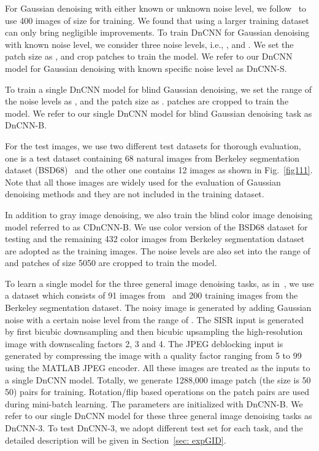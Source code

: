 \documentclass[journal]{IEEEtran}
\begin{document}
For Gaussian denoising with either known or unknown noise level, we follow~\cite{chen2015trainable} to use 400 images of size  for training. We found that using a larger training dataset can only bring negligible improvements. To train DnCNN for Gaussian denoising with known noise level, we consider three noise levels, i.e., ,  and .
We set the patch size as , and crop  patches to train the model. We refer to our DnCNN model for Gaussian denoising with known specific noise level as DnCNN-S.

To train a single DnCNN model for blind Gaussian denoising, we set the range of the noise levels as , and the patch size as .  patches are cropped to train the model. We refer to our single DnCNN model for blind Gaussian denoising task as DnCNN-B.

For the test images, we use two different test datasets for thorough evaluation, one is a test dataset containing 68 natural images from Berkeley segmentation dataset (BSD68)~\cite{roth2009fields} and the other one contains 12 images as shown in Fig.~\ref{fig111}. Note that all those images are widely used for the evaluation of Gaussian denoising methods and they are not included in the training dataset.

In addition to gray image denoising, we also train the blind color image denoising model referred to as CDnCNN-B. We use color version of the BSD68 dataset for testing and
the remaining 432 color images from Berkeley segmentation dataset are adopted as the training images. The noise levels are also set into the range of  and  patches of size 5050 are cropped to train the model.

{To learn a single model for the three general image denoising tasks}, as in~\cite{kim2015accurate}, we use a dataset which consists of 91 images from~\cite{yang2010image} and 200 training images from the Berkeley segmentation dataset. The noisy image is generated by adding Gaussian noise with a certain noise level from the range of . The SISR input is generated by first bicubic downsampling and then bicubic upsampling the high-resolution image with downscaling factors 2, 3 and 4. The JPEG deblocking input is generated by compressing the image with a quality factor ranging from 5 to 99 using the MATLAB JPEG encoder. All these images are treated as the inputs to a single DnCNN model. Totally, we generate 1288,000 image patch (the size is 50  50) pairs for training. Rotation/flip based operations on the patch pairs are used during mini-batch learning. The parameters are initialized with DnCNN-B. We refer to our single DnCNN model for these three general image denoising tasks as DnCNN-3. To test DnCNN-3, we adopt different test set for each task, and the detailed description will be given in Section~\ref{sec: expGID}.
\end{document}
